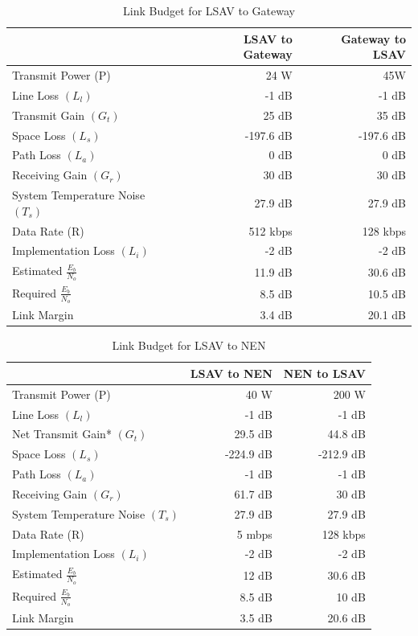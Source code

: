 \documentclass[10pt]{article}
\begin{document}
\begin{table}[H]
  \centering
  \caption{Link Budget for LSAV to Gateway}
  \label{table:linkbudgetlsav}
  \begin{tabular}{lrr}
    {} & LSAV to Gateway &Gateway to LSAV \\ \hline

    Transmit Power (P)&24 W&45W \\

    Line  Loss \((L_l)\)&-1 dB&-1 dB \\
    Transmit Gain \((G_t)\)&25 dB&35 dB \\
    Space Loss \((L_s)\)&-197.6 dB&-197.6 dB \\
    Path Loss \((L_a)\)&0 dB&0 dB \\
    Receiving Gain \((G_r)\)&30 dB&30 dB \\
    System Temperature Noise \((T_s)\)&27.9 dB&27.9 dB \\
    Data Rate (R)&512 kbps&128 kbps \\
    Implementation Loss \((L_i)\)&-2 dB&-2 dB \\
    Estimated \(\frac{E_b}{N_o}\)&11.9 dB&30.6 dB \\
    Required \(\frac{E_b}{N_o}\)&8.5 dB&10.5 dB \\
    Link Margin&3.4 dB&20.1 dB \\

  \end{tabular}
\end{table}

\begin{table}[H]
  \centering
  \caption{Link Budget for LSAV to NEN}
  \begin{tabular}{lrr}
    &LSAV to NEN&NEN to LSAV \\ \hline 
    Transmit Power (P)&40 W&200 W \\
    Line  Loss \((L_l)\)&-1 dB&-1 dB \\
    Net Transmit Gain* \((G_t)\)&29.5 dB&44.8 dB \\
    Space Loss \((L_s)\)&-224.9 dB&-212.9 dB \\
    Path Loss \((L_a)\)&-1 dB&-1 dB \\
    Receiving Gain \((G_r)\)&61.7 dB&30 dB \\
    System Temperature Noise \((T_s)\)&27.9 dB&27.9 dB \\
    Data Rate (R)&5 mbps&128 kbps \\
    Implementation Loss \((L_i)\)&-2 dB&-2 dB \\
    Estimated \(\frac{E_b}{N_o}\)&12 dB&30.6 dB \\
    Required \(\frac{E_b}{N_o}\)&8.5 dB&10 dB \\
    Link Margin&3.5 dB&20.6 dB \\
  \end{tabular}
\end{table}
\end{document}
